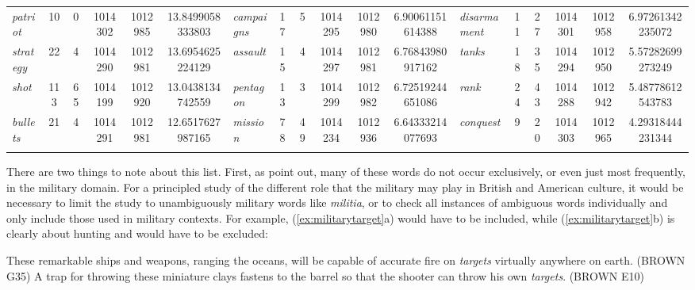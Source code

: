 \begin{table}
{\begin{tabular}{l *{2}{S[table-format=4]} *{2}{S[table-format=8]} Sl *{2}{S[table-format=4]} *{2}{S[table-format=8]} Sl *{2}{S[table-format=2]} *{2}{S[table-format=8]} S}
\textit{patriot} & 10 & 0 & 1014302 & 1012985 & 13.8499058333803 & \textit{campaigns} & 17 & 5 & 1014295 & 1012980 & 6.90061151614388 & \textit{disarmament} & 11 & 27 & 1014301 & 1012958 & 6.97261342235072 \\
\textit{strategy} & 22 & 4 & 1014290 & 1012981 & 13.6954625224129 & \textit{assault} & 15 & 4 & 1014297 & 1012981 & 6.76843980917162 & \textit{tanks} & 18 & 35 & 1014294 & 1012950 & 5.57282699273249 \\
\textit{shot} & 113 & 65 & 1014199 & 1012920 & 13.0438134742559 & \textit{pentagon} & 13 & 3 & 1014299 & 1012982 & 6.72519244651086 & \textit{rank} & 24 & 43 & 1014288 & 1012942 & 5.48778612543783 \\
\textit{bullets} & 21 & 4 & 1014291 & 1012981 & 12.6517627987165 & \textit{mission} & 78 & 49 & 1014234 & 1012936 & 6.64333214077693 & \textit{conquest} & 9 & 20 & 1014303 & 1012965 & 4.29318444231344\\
\lspbottomrule
{} \\ %
\end{tabular}}
\end{table}

There are two things to note about this list. First, as \citet{leech_computer_1992} point out, many of these words do not occur exclusively, or even just most frequently, in the military domain. For a principled study of the different role that the military may play in British  and American  culture,  it would be necessary to limit the study to unambiguously military words like \textit{militia}, or to check all instances of ambiguous  words individually and only include those used in military contexts. For example, (\ref{ex:militarytarget}a) would have to be included, while (\ref{ex:militarytarget}b) is clearly about hunting and would have to be excluded:\largerpage

\begin{exe}
\ex
\begin{xlist}
\label{ex:militarytarget}
\ex These remarkable ships and weapons, ranging the oceans, will be capable of accurate fire on \textit{targets} virtually anywhere on earth. (BROWN G35)
\ex A trap for throwing these miniature clays fastens to the barrel so that the shooter can throw his own \textit{targets}. (BROWN E10)
\end{xlist}
\end{exe}

